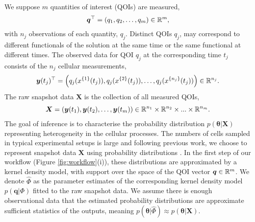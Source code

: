 We suppose $m$ quantities of interest (QOIs) are measured,
%
\begin{equation}
\boldsymbol{q}^\top = \left( q_1, q_2, \dots, q_m \right) \in \mathbb{R}^m,
\end{equation}
%
with $n_j$ observations of each quantity, $q_j$. Distinct QOIs $q_j$, may correspond to different functionals of the solution at the same time or the same functional at different times. The observed data for QOI $q_j$ at the corresponding time $t_j$ consists of the $n_j$ cellular measurements,
%
\begin{equation}
\boldsymbol{y}(t_j)^\top = \left( q_j(x^{\{1\}}(t_j)), q_j(x^{\{2\}}(t_j)), \dots, q_j(x^{\{n_j\}}(t_j))  \right) \in \mathbb{R}^{n_j}.
\end{equation}
%
The raw snapshot data $\boldsymbol{X}$ is the collection of all measured QOIs,
%
\begin{equation}
\boldsymbol{X} = \left( \boldsymbol{y}(t_1), \boldsymbol{y}(t_2), \dots, \boldsymbol{y}(t_m) \right) \in \mathbb{R}^{n_1} \times \mathbb{R}^{n_2}\times...\times\mathbb{R}^{n_m}.
\end{equation}
%
The goal of inference is to characterise the probability distribution $p(\boldsymbol{\theta}|\boldsymbol{X})$ representing heterogeneity in the cellular processes.
The numbers of cells sampled in typical experimental setups is large and following previous work, we choose to represent snapshot data $\boldsymbol{X}$ using probability distributions \cite{hasenauer2011identification,hasenauer2014ode,loos2018hierarchical,dixit2018maximum}. In the first step of our workflow (Figure \ref{fig:workflow}(i)), these distributions are approximated by a kernel density model, with support over the space of the QOI vector $\boldsymbol{q}\in\mathbb{R}^m$. We denote $\hat{\Phi}$ as the parameter estimates of the corresponding kernel density model $p(\boldsymbol{q}|\Phi)$ fitted to the raw snapshot data. We assume there is enough observational data that the estimated probability distributions are approximate sufficient statistics of the outputs, meaning $p(\boldsymbol{\theta}|\hat{\Phi}) \approx p(\boldsymbol{\theta}|\boldsymbol{X})$.


